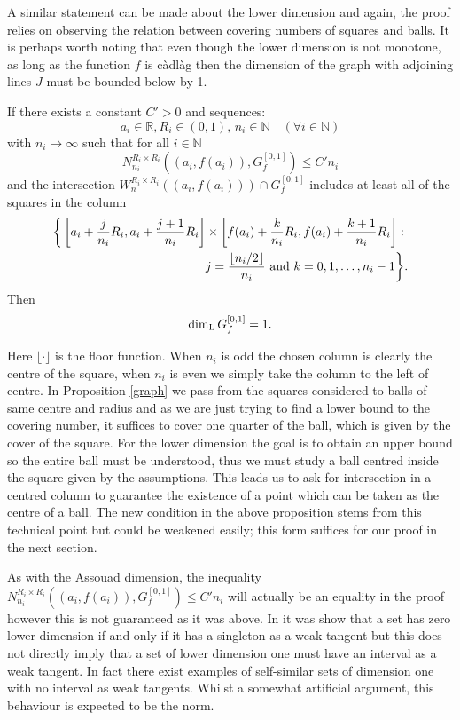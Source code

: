 A similar statement can be made about the lower dimension and again, the proof relies on observing the relation between covering numbers of squares and balls. It is perhaps worth noting that even though the lower dimension is not monotone, as long as the function $f$ is c\`adl\`ag then the dimension of the graph with adjoining lines $J$ must be bounded below by 1.
\begin{proposition}\label{graph-lower}
	If there exists a constant $C'>0$ and sequences:
	\[
	a_i\in \mathbb{R},R_i\in (0,1),\, n_i\in\mathbb{N} \quad (\forall i\in \mathbb{N})
	\]
	with $n_i \rightarrow \infty$ such that for all $i\in\mathbb{N}$
	\[
	N_{n_i}^{R_i \times R_i }((a_i,f(a_i)),G_f^{[0,1]})\leq C' n_i
	\]
	and the intersection $W_n^{R_i \times R_i}((a_i,f(a_i))) \cap G_f^{[0,1]}$ includes at least all of the squares in the column 
	\begin{align*}
	    	\bigg\{ \left[a_i + \frac{j}{n_i}R_i, a_i + \frac{j+1}{n_i}R_i \right] &\times \left[f(a_i) + \frac{k}{n_i}R_i, f(a_i) + \frac{k+1}{n_i}R_i \right] \colon \\
	    	&j = \frac{\lfloor n_i/2 \rfloor }{n_i} \textup{ and } k = 0, 1,\ldots, n_i - 1 \bigg\}.
	\end{align*}
	Then
	\[
	\dim_{\textup{L}} G_f^{[0,1]}=1.
	\]
\end{proposition}

Here $\lfloor \cdot \rfloor$ is the floor function. When $n_i$ is odd the chosen column is clearly the centre of the square, when $n_i$ is even we simply take the column to the left of centre. In Proposition \ref{graph} we pass from the squares considered to balls of same centre and radius and as we are just trying to find a lower bound to the covering number, it suffices to cover one quarter of the ball, which is given by the cover of the square. For the lower dimension the goal is to obtain an upper bound so the entire ball must be understood, thus we must study a ball centred inside the square given by the assumptions. This leads us to ask for intersection in a centred column to guarantee the existence of a point which can be taken as the centre of a ball. The new condition in the above proposition stems from this technical point but could be weakened easily; this form suffices for our proof in the next section.

As with the Assouad dimension, the inequality $N_{n_i}^{R_i \times R_i }((a_i,f(a_i)),G_f^{[0,1]})\leq C' n_i$ will actually be an equality in the proof however this is not guaranteed as it was above. In \cite{microsets} it was show that a set has zero lower dimension if and only if it has a singleton as a weak tangent but this does not directly imply that a set of lower dimension one must have an interval as a weak tangent. In fact there exist examples of self-similar sets of dimension one with no interval as weak tangents. Whilst a somewhat artificial argument, this behaviour is expected to be the norm.


